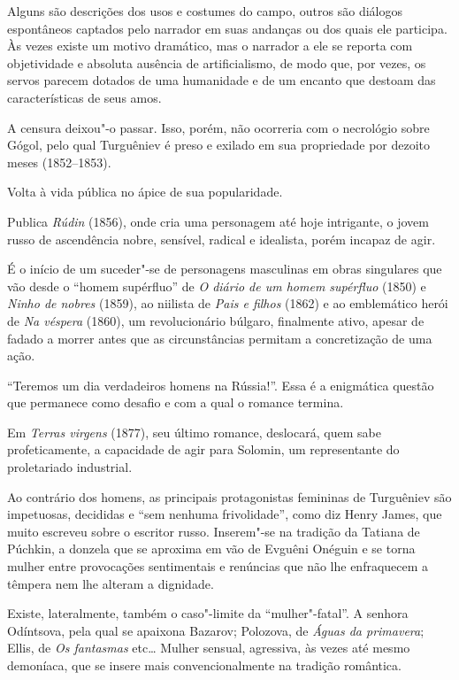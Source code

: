 Alguns são descrições dos usos e costumes do campo, outros são diálogos
espontâneos captados pelo narrador em suas andanças ou dos quais ele
participa. Às vezes existe um motivo dramático, mas o narrador a ele se
reporta com objetividade e absoluta ausência de artificialismo, de modo
que, por vezes, os servos parecem dotados de uma humanidade e de um encanto
que destoam das características de seus amos.

A censura deixou"-o passar. Isso, porém, não ocorreria com o necrológio
sobre Gógol, pelo qual Turguêniev é preso e exilado em sua propriedade
por dezoito meses (1852--1853).

Volta à vida pública no ápice de sua popularidade.

Publica \emph{Rúdin} (1856), onde cria uma personagem até hoje
intrigante, o jovem russo de ascendência nobre, sensível, radical e
idealista, porém incapaz de agir.

É o início de um suceder"-se de personagens masculinas em obras
singulares que vão desde o ``homem supérfluo'' de \emph{O diário de um
homem supérfluo} (1850) e \emph{Ninho de nobres} (1859), ao niilista de
\emph{Pais e filhos} (1862) e ao emblemático herói de \emph{Na véspera}
(1860), um revolucionário búlgaro, finalmente ativo, apesar de fadado a
morrer antes que as circunstâncias permitam a concretização de uma ação.

``Teremos um dia verdadeiros homens na Rússia!''. Essa é a enigmática
questão que permanece como desafio e com a qual o romance termina.

Em \emph{Terras virgens} (1877), seu último romance, deslocará, quem
sabe profeticamente, a capacidade de agir para Solomin, um representante
do proletariado industrial.

Ao contrário dos homens, as principais protagonistas femininas de
Turguêniev são impetuosas, decididas e ``sem nenhuma frivolidade'', como
diz Henry James, que muito escreveu sobre o escritor russo. Inserem"-se
na tradição da Tatiana de Púchkin, a donzela que se aproxima em vão de Evguêni Onéguin e se
torna mulher entre provocações sentimentais e renúncias que não lhe
enfraquecem a têmpera nem lhe alteram a dignidade.

Existe, lateralmente, também o caso"-limite da ``mulher"-fatal''. A
senhora Odíntsova, pela qual se apaixona Bazarov; Polozova, de
\emph{Águas da primavera}; Ellis, de \emph{Os fantasmas} etc\ldots{} Mulher
sensual, agressiva, às vezes até mesmo demoníaca, que se insere mais
convencionalmente na tradição romântica.

